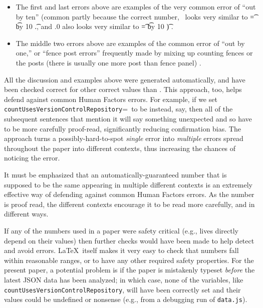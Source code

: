 \documentclass[10pt,a4paper]{article}
\begin{document}
\begin{itemize}\raggedright
\item
The first and last errors above are examples of the very common error of ``out by ten'' (common partly because the correct number, \the\countUsesVersionControlRepository\ looks very similar to \t=\countUsesVersionControlRepository
\divide \t by 10
\the\t.\the\fraction, and \the\countUsesVersionControlRepository.0 also looks very similar to 
\t=\countUsesVersionControlRepository
\multiply \t by 10
\the\t) \cite{fixit}. 

\item
The middle two errors above are examples of the common error of ``out by one,'' or ``fence post errors'' frequently made by mixing up counting fences or the posts (there is usually one more post than fence panel) \cite{fixit}.
\end{itemize}

All the discussion and examples above were generated automatically, and have been checked correct for other correct values than \the\countUsesVersionControlRepository. This approach, too, helps defend against common Human Factors errors. For example, if we set \texttt{\bslash countUsesVersionControlRepository}=\the\countUsesVersionControlRepository\ to be  instead, say, then all of the subsequent sentences that mention it will say something unexpected and so have to be more carefully proof-read, significantly reducing confirmation bias. The approach turns a possibly-hard-to-spot \emph{single\/} error into \emph{multiple\/} errors spread throughout the paper into different contexts, thus increasing the chances of noticing the error.

It must be emphasized that an automatically-guaranteed number that is supposed to be the same appearing in multiple different contexts is an extremely effective way of defending against common Human Factors errors. As the number is proof read, the different contexts encourage it to be read more carefully, and in different ways.

If any of the numbers used in a paper were safety critical (e.g., lives directly depend on their values) then further checks would have been made to help detect and avoid errors. \LaTeX\ itself makes it very easy to check that numbers fall within reasonable ranges, or to have any other required safety properties. For the present paper, a potential problem is if the paper is mistakenly typeset \emph{before\/} the latest JSON data has been analyzed; in which case, none of the variables, like \texttt{\bslash countUsesVersionControlRepository}, will have been correctly set and their values could be undefined or nonsense (e.g., from a debugging run of \texttt{data.js}). 
\end{document}
